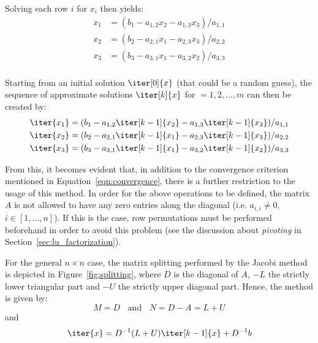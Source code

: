\noindent Solving each row $i$ for $x_i$ then yields:
\begin{equation}
   \begin{aligned}
    x_1 & =  (b_1 -a_{1,2}x_2 - a_{1,3}x_3)/a_{1,1} \\
    x_2 & =  (b_2 -a_{2,1}x_1 - a_{2,3}x_3)/a_{2,2} \\
    x_3 & =  (b_3 -a_{3,1}x_1 - a_{3,2}x_2)/a_{3,3} \\
\end{aligned} 
\end{equation}

\noindent Starting from an initial solution $\iter[0]{x}$ (that could be a random guess), the sequence of approximate solutions $\iter[k]{x}$ for $ = 1,2, \dots, m$ can then be created by:
\begin{equation}
\label{eqn:jacobi_3x3}
   \begin{aligned}
    \iter{x_1} & =  (b_1 -a_{1,2}\iter[k-1]{x_2} - a_{1,3}\iter[k-1]{x_3})/a_{1,1} \\
    \iter{x_2} & =  (b_2 -a_{2,1}\iter[k-1]{x_1} - a_{2,3}\iter[k-1]{x_3})/a_{2,2} \\
    \iter{x_3} & =  (b_3 -a_{3,1}\iter[k-1]{x_1} - a_{3,2}\iter[k-1]{x_2})/a_{3,3} \\
\end{aligned} 
\end{equation}

\noindent From this, it becomes evident that, in addition to the convergence criterion mentioned in Equation~\hyperref[eqn:convergence]{\ref{eqn:convergence}}, there is a further restriction to the usage of this method. In order for the above operations to be defined, the matrix $A$ is not allowed to have any zero entries along the diagonal (i.e. $a_{i,i} \neq 0$, $i \in [1,\dots, n]$). If this is the case, row permutations must be performed beforehand in order to avoid this problem (see the discussion about \textit{pivoting} in Section~\hyperref[sec:lu_factorization]{\ref{sec:lu_factorization}}).

For the general $n \times n$ case, the matrix splitting performed by the Jacobi method is depicted in Figure~\hyperref[fig:splitting]{\ref{fig:splitting}}, where $D$ is the diagonal of $A$, $-L$ the strictly lower triangular part and $-U$ the strictly upper diagonal part. Hence, the method is given by:
\begin{equation}
    M=D \;\;\text{ and } \;\; N=D-A=L+U
\end{equation}
\noindent and
\begin{equation}
    \iter{x} = D^{-1}(L+U)\iter[k-1]{x} +D^{-1}b
\end{equation}

